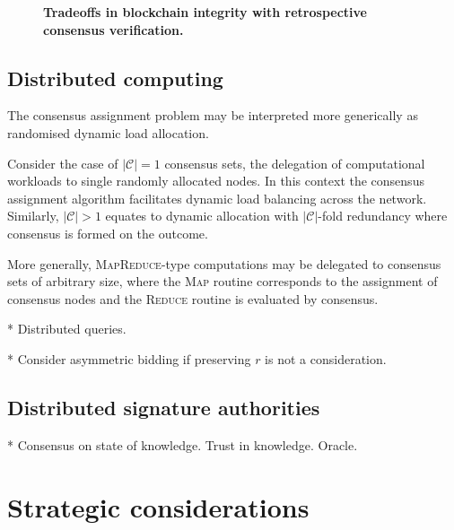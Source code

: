 \documentclass[twocolumn, aps, amsmath, amssymb, nofootinbib, superscriptaddress, longbibliography, floatfix, eqsecnum, rmp]{revtex4-2}
\begin{document}
\begin{figure}[!htb]
\centering

\caption{\textbf{Tradeoffs in blockchain integrity with retrospective consensus verification.}}\label{fig:blockchain_security_tradeoff}	
\end{figure}

\subsection{Distributed computing}

The consensus assignment problem may be interpreted more generically as randomised dynamic load allocation.

Consider the case of $|\mathcal{C}|=1$ consensus sets, the delegation of computational workloads to single randomly allocated nodes. In this context the consensus assignment algorithm facilitates dynamic load balancing across the network. Similarly, \mbox{$|\mathcal{C}|>1$} equates to dynamic allocation with $|\mathcal{C}|$-fold redundancy where consensus is formed on the outcome.

More generally, \textsc{MapReduce}-type  \cite{MapReduce} computations may be delegated to consensus sets of arbitrary size, where the \textsc{Map} routine corresponds to the assignment of consensus nodes and the \textsc{Reduce} routine is evaluated by consensus.

* Distributed queries.

* Consider asymmetric bidding if preserving $r$ is not a consideration.

\subsection{Distributed signature authorities}

* Consensus on state of knowledge. Trust in knowledge. Oracle.



\section{Strategic considerations} \label{sec:strategic_cons}
\end{document}
